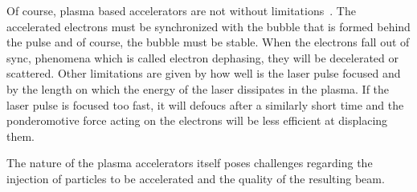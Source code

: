 \documentclass[12pt, class=report, crop=false]{standalone}
\begin{document}
Of course, plasma based accelerators are not without
limitations~\autocite[8]{oneil_laserwakefield_2017}.
The accelerated electrons must be synchronized with the bubble that
is formed behind the pulse and of course, the bubble must be stable.
When the electrons fall out of sync, phenomena which is called
electron dephasing, they will be decelerated or scattered.
Other limitations are given by how well is the laser pulse focused
and by the length on which the energy of the laser dissipates in
the plasma.
If the laser pulse is focused too fast, it will defoucs after a
similarly short time and the ponderomotive force acting on the
electrons will be less efficient at displacing them.

The nature of the plasma accelerators itself poses challenges
regarding the injection of particles to be accelerated and the
quality of the resulting beam.
\end{document}
